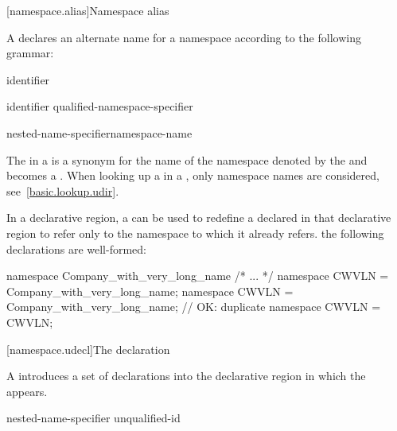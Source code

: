 [namespace.alias]{Namespace alias}%
%
%

\pnum
A  declares an alternate name for a
namespace according to the following grammar:

\begin{bnf}
\br
        identifier
\end{bnf}

\begin{bnf}
\br
         identifier \terminal{=} qualified-namespace-specifier \terminal{;}
\end{bnf}

\begin{bnf}
\br
    nested-name-specifier\opt namespace-name
\end{bnf}

\pnum
The  in a  is
a synonym for the name of the namespace denoted by the
 and becomes a
.
\enternote
When looking up a  in a
, only namespace names are
considered, see~\ref{basic.lookup.udir}.
\exitnote

\pnum
In a declarative region, a  can be
used to redefine a  declared in that
declarative region to refer only to the namespace to which it already
refers.
\enterexample
the following declarations are well-formed:

\begin{codeblock}
namespace Company_with_very_long_name { /* ... */ }
namespace CWVLN = Company_with_very_long_name;
namespace CWVLN = Company_with_very_long_name;          // OK: duplicate
namespace CWVLN = CWVLN;
\end{codeblock}
\exitexample

[namespace.udecl]{The  declaration}%

\pnum
A  introduces a set of declarations into the declarative
region in which the  appears.

\begin{bnf}
\br
     nested-name-specifier unqualified-id \terminal{;}\br
\end{bnf}

